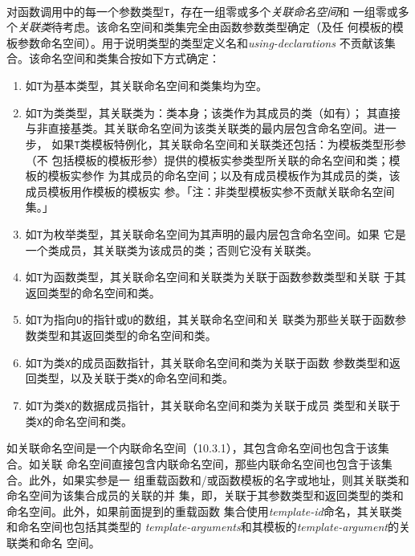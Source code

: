 \paragraph{}
对函数调用中的每一个参数类型\texttt{T}，存在一组零或多个\textit{关联命名空间}和
一组零或多个\textit{关联类}待考虑。该命名空间和类集完全由函数参数类型确定（及任
何模板的模板参数命名空间）。用于说明类型的类型定义名和\textit{using-declarations}
不贡献该集合。该命名空间和类集合按如下方式确定：
\begin{enumerate}
  \item{如\texttt{T}为基本类型，其关联命名空间和类集均为空。}
  \item{如\texttt{T}为类类型，其关联类为：类本身；该类作为其成员的类（如有）；
    其直接与非直接基类。其关联命名空间为该类关联类的最内层包含命名空间。进一步，
    如果\texttt{T}类模板特例化，其关联命名空间和关联类还包括：为模板类型形参（不
    包括模板的模板形参）提供的模板实参类型所关联的命名空间和类；模板的模板实参作
    为其成员的命名空间；以及有成员模板作为其成员的类，该成员模板用作模板的模板实
    参。「注：非类型模板实参不贡献关联命名空间集。」}
  \item{如\texttt{T}为枚举类型，其关联命名空间为其声明的最内层包含命名空间。如果
    它是一个类成员，其关联类为该成员的类；否则它没有关联类。}
  \item{如\texttt{T}为函数类型，其关联命名空间和关联类为关联于函数参数类型和关联
    于其返回类型的命名空间和类。}
  \item{如\texttt{T}为指向\texttt{U}的指针或\texttt{U}的数组，其关联命名空间和关
    联类为那些关联于函数参数类型和其返回类型的命名空间和类。}
  \item{如\texttt{T}为类\texttt{X}的成员函数指针，其关联命名空间和类为关联于函数
    参数类型和返回类型，以及关联于类\texttt{X}的命名空间和类。}
  \item{如\texttt{T}为类\texttt{X}的数据成员指针，其关联命名空间和类为关联于成员
    类型和关联于类\texttt{X}的命名空间和类。}
\end{enumerate}
如关联命名空间是一个内联命名空间（10.3.1），其包含命名空间也包含于该集合。如关联
命名空间直接包含内联命名空间，那些内联命名空间也包含于该集合。此外，如果实参是一
组重载函数和/或函数模板的名字或地址，则其关联类和命名空间为该集合成员的关联的并
集，即，关联于其参数类型和返回类型的类和命名空间。此外，如果前面提到的重载函数
集合使用\textit{template-id}命名，其关联类和命名空间也包括其类型的
\textit{template-arguments}和其模板的\textit{template-argument}的关联类和命名
空间。

